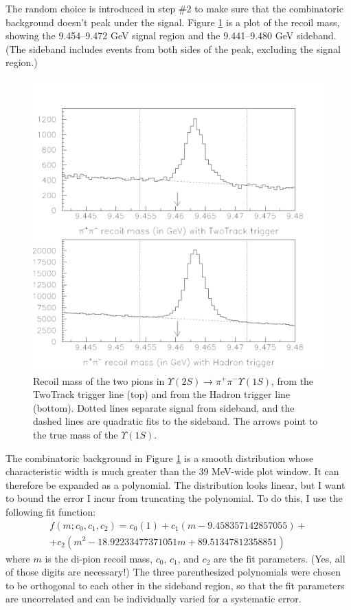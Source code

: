 The random choice is introduced in step \#2 to make sure that the
combinatoric background doesn't peak under the signal.  Figure
\ref{cascades_recoilmass} is a plot of the recoil mass, showing the
9.454--9.472 GeV signal region and the 9.441--9.480 GeV sideband.
(The sideband includes events from both sides of the peak, excluding
the signal region.)

\begin{figure}[p]
  \includegraphics[width=\linewidth]{plots/cascades_recoilmass}
  \caption{\label{cascades_recoilmass} Recoil mass of the two pions in
  $\Upsilon(2S) \to \pi^+\pi^- \Upsilon(1S)$, from the TwoTrack
  trigger line (top) and from the Hadron trigger line (bottom).
  Dotted lines separate signal from sideband, and the dashed lines are
  quadratic fits to the sideband.  The arrows point to the true mass
  of the $\Upsilon(1S)$.}
\end{figure}

The combinatoric background in Figure \ref{cascades_recoilmass} is a
smooth distribution whose characteristic width is much greater than
the 39 MeV-wide plot window.  It can therefore be expanded as a
polynomial.  The distribution looks linear, but I want to bound the
error I incur from truncating the polynomial.  To do this, I use the
following fit function:
\begin{multline}
  f(m; c_0, c_1, c_2) = c_0(1) + c_1 (m - 9.458357142857055) + \\
  + c_2 (m^2-18.92233477371051 m+89.51347812358851) \label{cascades:eqn_fitfunc}
\end{multline}
where $m$ is the di-pion recoil mass, $c_0$, $c_1$, and $c_2$ are the
fit parameters.  (Yes, all of those digits are necessary!)  The three
parenthesized polynomials were chosen to be orthogonal to each other
in the sideband region, so that the fit parameters are uncorrelated
and can be individually varied for a systematic error.

